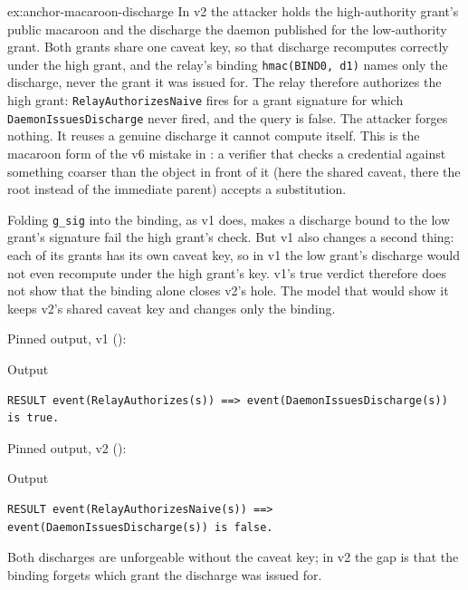 \documentclass[11pt,a4paper]{article}
\theoremstyle{definition}
\begin{document}
\begin{pdsolution}{ex:anchor-macaroon-discharge}
In v2 the attacker holds the high-authority grant's public macaroon and the discharge the daemon published for the low-authority grant. Both grants share one caveat key, so that discharge recomputes correctly under the high grant, and the relay's binding \texttt{hmac(BIND0, d1)} names only the discharge, never the grant it was issued for. The relay therefore authorizes the high grant: \texttt{RelayAuthorizesNaive} fires for a grant signature for which \texttt{DaemonIssuesDischarge} never fired, and the query is false. The attacker forges nothing. It reuses a genuine discharge it cannot compute itself. This is the macaroon form of the v6 mistake in : a verifier that checks a credential against something coarser than the object in front of it (here the shared caveat, there the root instead of the immediate parent) accepts a substitution.

Folding \texttt{g\_sig} into the binding, as v1 does, makes a discharge bound to the low grant's signature fail the high grant's check. But v1 also changes a second thing: each of its grants has its own caveat key, so in v1 the low grant's discharge would not even recompute under the high grant's key. v1's true verdict therefore does not show that the binding alone closes v2's hole. The model that would show it keeps v2's shared caveat key and changes only the binding.

Pinned output, v1 ():
\begin{pdlisting}{Output}{}
\begin{lstlisting}[style=pdoutput]
RESULT event(RelayAuthorizes(s)) ==> event(DaemonIssuesDischarge(s)) is true.
\end{lstlisting}
\end{pdlisting}
Pinned output, v2 ():
\begin{pdlisting}{Output}{}
\begin{lstlisting}[style=pdoutput]
RESULT event(RelayAuthorizesNaive(s)) ==> event(DaemonIssuesDischarge(s)) is false.
\end{lstlisting}
\end{pdlisting}
Both discharges are unforgeable without the caveat key; in v2 the gap is that the binding forgets which grant the discharge was issued for.
\end{pdsolution}

\pdprintsolutions
\end{document}
